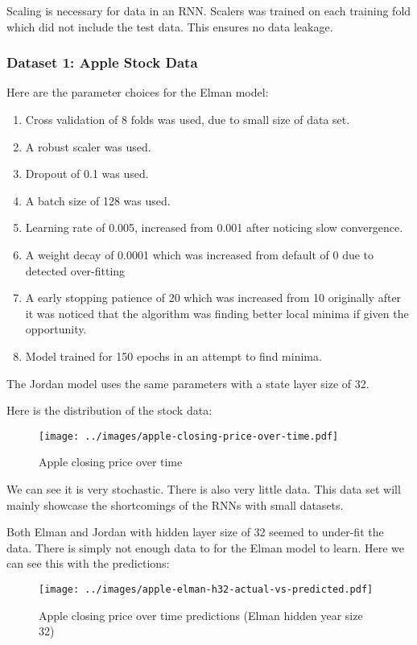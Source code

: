 \documentclass[conference]{IEEEtran}
\begin{document}
Scaling is necessary for data in an RNN. Scalers was trained on each training fold which did not include the test data. This ensures no data leakage.  

\subsubsection{Dataset 1: Apple Stock Data}

Here are the parameter choices for the Elman model:

\begin{enumerate}[]
	\item Cross validation of 8 folds was used, due to small size of data set.
	\item A robust scaler was used.
	\item Dropout of 0.1 was used.
	\item A batch size of 128 was used.
	\item Learning rate of 0.005, increased from 0.001 after noticing slow convergence.
	\item A weight decay of 0.0001 which was increased from default of 0 due to detected over-fitting
	\item A early stopping patience of 20 which was increased from 10 originally after it was noticed that the algorithm was finding better local minima if given the opportunity.
	\item Model trained for 150 epochs in an attempt to find minima.
\end{enumerate}

The Jordan model uses the same parameters with a state layer size of 32.

Here is the distribution of the stock data:

\begin{figure}[H] 
	\centering
	\texttt{[image: ../images/apple-closing-price-over-time.pdf]}
	\caption{Apple closing price over time}
	\label{fig:apple-closing}
\end{figure}

We can see it is very stochastic. There is also very little data. This data set will mainly showcase the shortcomings of the RNNs with small datasets. 

Both Elman and Jordan with hidden layer size of 32 seemed to under-fit the data. There is simply not enough data to for the Elman model to learn. Here we can see this with the predictions:

\begin{figure}[H] 
	\centering
	\texttt{[image: ../images/apple-elman-h32-actual-vs-predicted.pdf]}
	\caption{Apple closing price over time predictions (Elman hidden year size 32)}
	\label{fig:apple-closing-predictions}
\end{figure}
\end{document}

